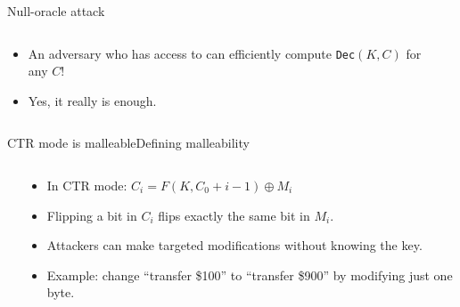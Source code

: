\documentclass[aspectratio=169, lualatex, handout]{beamer}
\begin{document}
\begin{frame}{Null-oracle attack}
	\begin{columns}[c]
		\begin{column}{0.6\textwidth}
			\begin{itemize}
				\item An adversary who has access to  can efficiently compute \texttt{Dec}$(K, C)$ for any $C$!
				\item Yes, it really is enough.
			\end{itemize}
		\end{column}
		\begin{column}{0.4\textwidth}
		\end{column}
	\end{columns}
\end{frame}

\begin{frame}{CTR mode is malleable}{Defining malleability}
	\begin{columns}[c]
		\begin{column}{0.5\textwidth}
		\end{column}
		\begin{column}{0.5\textwidth}
			\begin{itemize}
				\item In CTR mode: $C_i = F(K, C_0 + i - 1) \oplus M_i$
				\item Flipping a bit in $C_i$ flips exactly the same bit in $M_i$.
				\item Attackers can make targeted modifications without knowing the key.
				\item Example: change ``transfer \$100'' to ``transfer \$900'' by modifying just one byte.
			\end{itemize}
		\end{column}
	\end{columns}
\end{frame}
\end{document}
